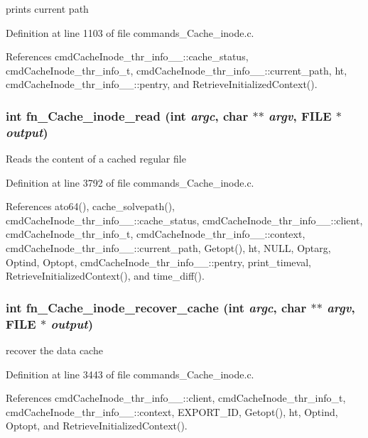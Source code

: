 prints current path 

Definition at line 1103 of file commands\_\-Cache\_\-inode.c.

References cmd\-Cache\-Inode\_\-thr\_\-info\_\-\_\-::cache\_\-status, cmd\-Cache\-Inode\_\-thr\_\-info\_\-t, cmd\-Cache\-Inode\_\-thr\_\-info\_\-\_\-::current\_\-path, ht, cmd\-Cache\-Inode\_\-thr\_\-info\_\-\_\-::pentry, and Retrieve\-Initialized\-Context().
\subsubsection{\setlength{\rightskip}{0pt plus 5cm}int fn\_\-Cache\_\-inode\_\-read (int {\em argc}, char $\ast$$\ast$ {\em argv}, FILE $\ast$ {\em output})}\label{commands_8h_a55}


Reads the content of a cached regular file 

Definition at line 3792 of file commands\_\-Cache\_\-inode.c.

References ato64(), cache\_\-solvepath(), cmd\-Cache\-Inode\_\-thr\_\-info\_\-\_\-::cache\_\-status, cmd\-Cache\-Inode\_\-thr\_\-info\_\-\_\-::client, cmd\-Cache\-Inode\_\-thr\_\-info\_\-t, cmd\-Cache\-Inode\_\-thr\_\-info\_\-\_\-::context, cmd\-Cache\-Inode\_\-thr\_\-info\_\-\_\-::current\_\-path, Getopt(), ht, NULL, Optarg, Optind, Optopt, cmd\-Cache\-Inode\_\-thr\_\-info\_\-\_\-::pentry, print\_\-timeval, Retrieve\-Initialized\-Context(), and time\_\-diff().
\subsubsection{\setlength{\rightskip}{0pt plus 5cm}int fn\_\-Cache\_\-inode\_\-recover\_\-cache (int {\em argc}, char $\ast$$\ast$ {\em argv}, FILE $\ast$ {\em output})}\label{commands_8h_a51}


recover the data cache 

Definition at line 3443 of file commands\_\-Cache\_\-inode.c.

References cmd\-Cache\-Inode\_\-thr\_\-info\_\-\_\-::client, cmd\-Cache\-Inode\_\-thr\_\-info\_\-t, cmd\-Cache\-Inode\_\-thr\_\-info\_\-\_\-::context, EXPORT\_\-ID, Getopt(), ht, Optind, Optopt, and Retrieve\-Initialized\-Context().
